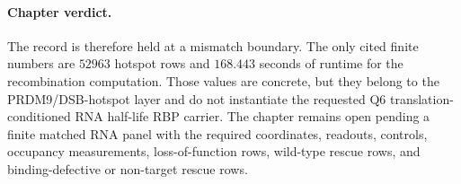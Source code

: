 \paragraph{Chapter verdict.}
The record is therefore held at a mismatch boundary. The only cited finite numbers are $52963$ hotspot rows and $168.443$ seconds of runtime for the recombination computation. Those values are concrete, but they belong to the PRDM9/DSB-hotspot layer and do not instantiate the requested Q6 translation-conditioned RNA half-life RBP carrier. The chapter remains open pending a finite matched RNA panel with the required coordinates, readouts, controls, occupancy measurements, loss-of-function rows, wild-type rescue rows, and binding-defective or non-target rescue rows.
